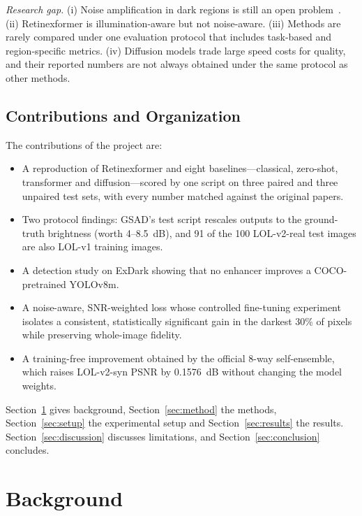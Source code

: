 \documentclass[journal]{IEEEtran}
\begin{document}
\emph{Research gap.} (i) Noise amplification in dark regions is still an open problem~\cite{li2022survey}.
(ii) Retinexformer is illumination-aware but not noise-aware. (iii) Methods are rarely compared under one evaluation
protocol that includes task-based and region-specific metrics. (iv) Diffusion models trade large speed costs for
quality, and their reported numbers are not always obtained under the same protocol as other methods.

\subsection{Contributions and Organization}
The contributions of the project are:
\begin{itemize}
\item A reproduction of Retinexformer and eight baselines---classical, zero-shot, transformer and diffusion---scored by
one script on three paired and three unpaired test sets, with every number matched against the original papers.
\item Two protocol findings: GSAD's test script rescales outputs to the ground-truth brightness (worth 4--8.5~dB), and
91 of the 100 LOL-v2-real test images are also LOL-v1 training images.
\item A detection study on ExDark showing that no enhancer improves a COCO-pretrained YOLOv8m.
\item A noise-aware, SNR-weighted loss whose controlled fine-tuning experiment isolates a consistent, statistically
significant gain in the darkest 30\% of pixels while preserving whole-image fidelity.
\item A training-free improvement obtained by the official 8-way self-ensemble, which raises LOL-v2-syn PSNR by
0.1576~dB without changing the model weights.
\end{itemize}
Section~\ref{sec:background} gives background, Section~\ref{sec:method} the methods, Section~\ref{sec:setup} the
experimental setup and Section~\ref{sec:results} the results. Section~\ref{sec:discussion} discusses limitations,
and Section~\ref{sec:conclusion} concludes.

\section{Background}\label{sec:background}
\end{document}
